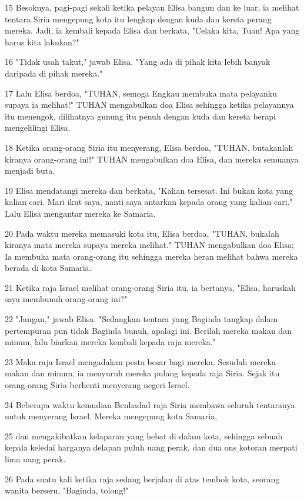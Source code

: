 \par 15 Besoknya, pagi-pagi sekali ketika pelayan Elisa bangun dan ke luar, ia melihat tentara Siria mengepung kota itu lengkap dengan kuda dan kereta perang mereka. Jadi, ia kembali kepada Elisa dan berkata, "Celaka kita, Tuan! Apa yang harus kita lakukan?"
\par 16 "Tidak usah takut," jawab Elisa. "Yang ada di pihak kita lebih banyak daripada di pihak mereka."
\par 17 Lalu Elisa berdoa, "TUHAN, semoga Engkau membuka mata pelayanku supaya ia melihat!" TUHAN mengabulkan doa Elisa sehingga ketika pelayannya itu menengok, dilihatnya gunung itu penuh dengan kuda dan kereta berapi mengelilingi Elisa.
\par 18 Ketika orang-orang Siria itu menyerang, Elisa berdoa, "TUHAN, butakanlah kiranya orang-orang ini!" TUHAN mengabulkan doa Elisa, dan mereka semuanya menjadi buta.
\par 19 Elisa mendatangi mereka dan berkata, "Kalian tersesat. Ini bukan kota yang kalian cari. Mari ikut saya, nanti saya antarkan kepada orang yang kalian cari." Lalu Elisa mengantar mereka ke Samaria.
\par 20 Pada waktu mereka memasuki kota itu, Elisa berdoa, "TUHAN, bukalah kiranya mata mereka supaya mereka melihat." TUHAN mengabulkan doa Elisa; Ia membuka mata orang-orang itu sehingga mereka heran melihat bahwa mereka berada di kota Samaria.
\par 21 Ketika raja Israel melihat orang-orang Siria itu, ia bertanya, "Elisa, haruskah saya membunuh orang-orang ini?"
\par 22 "Jangan," jawab Elisa. "Sedangkan tentara yang Baginda tangkap dalam pertempuran pun tidak Baginda bunuh, apalagi ini. Berilah mereka makan dan minum, lalu biarkan mereka kembali kepada raja mereka."
\par 23 Maka raja Israel mengadakan pesta besar bagi mereka. Sesudah mereka makan dan minum, ia menyuruh mereka pulang kepada raja Siria. Sejak itu orang-orang Siria berhenti menyerang negeri Israel.
\par 24 Beberapa waktu kemudian Benhadad raja Siria membawa seluruh tentaranya untuk menyerang Israel. Mereka mengepung kota Samaria,
\par 25 dan mengakibatkan kelaparan yang hebat di dalam kota, sehingga sebuah kepala keledai harganya delapan puluh uang perak, dan dua ons kotoran merpati lima uang perak.
\par 26 Pada suatu kali ketika raja sedang berjalan di atas tembok kota, seorang wanita berseru, "Baginda, tolong!"
